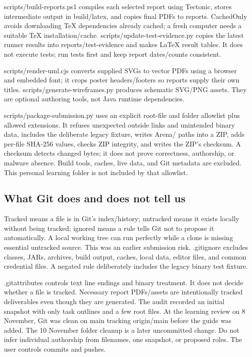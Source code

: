 \documentclass[12pt]{article}
\begin{document}
scripts/build-reports.ps1 compiles each selected report using Tectonic, stores intermediate output in build/latex, and copies final PDFs to reports. CachedOnly avoids downloading TeX dependencies already cached; a fresh computer needs a suitable TeX installation/cache. scripts/update-test-evidence.py copies the latest runner results into reports/test-evidence and makes LaTeX result tables. It does not execute tests; run tests first and keep report dates/counts consistent.

scripts/render-uml.cjs converts supplied SVGs to vector PDFs using a browser and embedded font; it crops poster headers/footers so reports supply their own titles. scripts/generate-wireframes.py produces schematic SVG/PNG assets. They are optional authoring tools, not Java runtime dependencies.

scripts/package-submission.py uses an explicit root-file and folder allowlist plus allowed extensions. It refuses unexpected outside links and unintended binary data, includes the deliberate legacy fixture, writes Arena/ paths into a ZIP, adds per-file SHA-256 values, checks ZIP integrity, and writes the ZIP's checksum. A checksum detects changed bytes; it does not prove correctness, authorship, or malware absence. Build tools, caches, live data, and Git metadata are excluded. This personal learning folder is not included by that allowlist.

\subsection{What Git does and does not tell us}
Tracked means a file is in Git's index/history; untracked means it exists locally without being tracked; ignored means a rule tells Git not to propose it automatically. A local working tree can run perfectly while a clone is missing essential untracked source. This was an earlier submission risk. .gitignore excludes classes, JARs, archives, build output, caches, local data, editor files, and common credential files. A negated rule deliberately includes the legacy binary test fixture.

.gitattributes controls text line endings and binary treatment. It does not decide whether a file is tracked. Necessary report PDFs/assets are intentionally tracked deliverables even though they are generated. The audit recorded an initial snapshot with only task outlines and a few root files. At the learning review on 8 November, Git was clean on main tracking origin/main before the guide was added. The 10 November folder cleanup is a later uncommitted change. Do not infer individual authorship from filenames, one snapshot, or proposed roles. The user controls commits and pushes.
\end{document}
